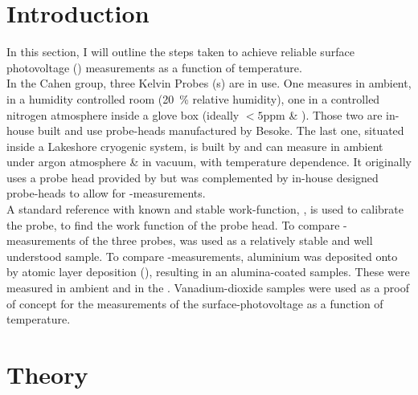 \section{Introduction}

In this section, I will outline the steps taken to achieve reliable surface photovoltage (\spv{}) measurements as a function of temperature.\\
In the Cahen group, three Kelvin Probes (\kp{}s) are in use. One measures in ambient, in a humidity controlled room (\SI{20}{\percent} relative humidity), one in a controlled nitrogen atmosphere inside a glove box (ideally $<\num{5}$ppm \oxy{} \& \water{}). Those two are in-house built and use probe-heads manufactured by Besoke. The last one, situated inside a Lakeshore cryogenic system, is built by \McA{} and can measure in ambient under argon atmosphere \& in vacuum, with temperature dependence. It originally uses a probe head provided by \McA{} but was complemented by in-house designed probe-heads to allow for \spv{}-measurements. \\
A standard reference with known and stable work-function, \hopg{}, is used to calibrate the probe, \ie{} to find the work function of the probe head. To compare \cpd{}-measurements of the three probes,  \sih{} was used as a relatively stable and well understood sample. To compare \spv{}-measurements, aluminium was deposited onto \sih{} by atomic layer deposition (\ald{}), resulting in an alumina-coated samples. These were measured in ambient and in the \McA{}. Vanadium-dioxide samples were used as a proof of concept for the measurements of the surface-photovoltage as a function of temperature.
\section{Theory}
